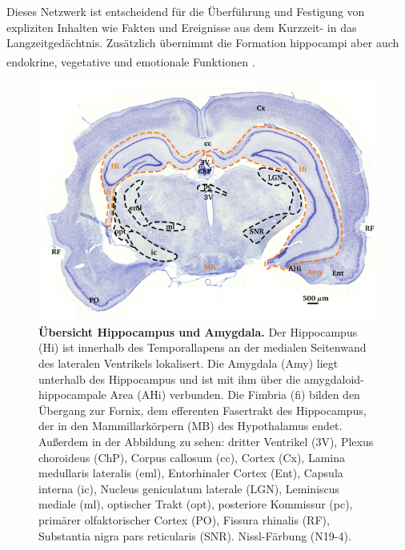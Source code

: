 Dieses Netzwerk ist entscheidend für die Überführung und Festigung von expliziten Inhalten wie Fakten und Ereignisse aus dem Kurzzeit- in das Langzeitgedächtnis. Zusätzlich übernimmt die Formation hippocampi aber auch endokrine, vegetative und emotionale Funktionen \textsuperscript{\cite[Kap.~9]{trepel2011neuroanatomie}}. 

\begin{figure}[H]
    \centering
    \includegraphics{pictures/Basalganglia/Hippo_uebersicht.png}
    \caption[Übersicht Hippocampus und Amygdala]{\textbf{Übersicht Hippocampus und Amygdala.} Der Hippocampus (Hi) ist innerhalb des Temporallapens an der medialen Seitenwand des lateralen Ventrikels lokalisert. Die Amygdala (Amy) liegt unterhalb des Hippocampus und ist mit ihm über die amygdaloid-hippocampale Area (AHi) verbunden. Die Fimbria (fi) bilden den Übergang zur Fornix, dem efferenten Fasertrakt des Hippocampus, der in den Mammillarkörpern (MB) des Hypothalamus endet. Außerdem in der Abbildung zu sehen: dritter Ventrikel (3V), Plexus choroideus (ChP), Corpus callosum (cc), Cortex (Cx), Lamina medullaris lateralis (eml), Entorhinaler Cortex (Ent), Capsula interna (ic), Nucleus geniculatum laterale (LGN), Leminiscus mediale (ml), optischer Trakt (opt), posteriore Kommissur (pc), primärer  olfaktorischer  Cortex (PO), Fissura rhinalis (RF), Substantia nigra pars reticularis (SNR). Nissl-Färbung (N19-4).}
    \label{fig:hippo_uebersicht}
\end{figure}

